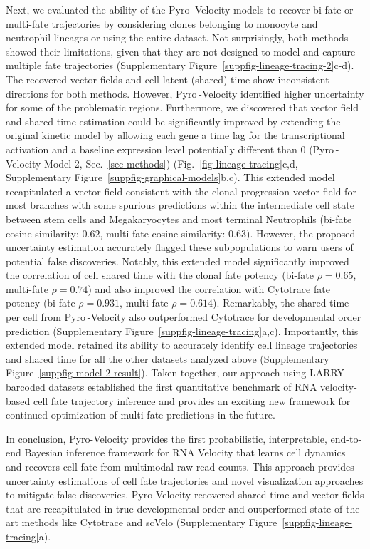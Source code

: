 \documentclass[
  sn-mathphys-num,
  lineno,
  twocolumn]{sn-jnl}
\begin{document}
Next, we evaluated the ability of the Pyro -Velocity models to recover
bi-fate or multi-fate trajectories by considering clones belonging to
monocyte and neutrophil lineages or using the entire dataset. Not
surprisingly, both methods showed their limitations, given that they are
not designed to model and capture multiple fate trajectories
(Supplementary Figure~\ref{suppfig-lineage-tracing-2}c-d). The recovered
vector fields and cell latent (shared) time show inconsistent directions
for both methods. However, Pyro -Velocity identified higher uncertainty
for some of the problematic regions. Furthermore, we discovered that
vector field and shared time estimation could be significantly improved
by extending the original kinetic model by allowing each gene a time lag
for the transcriptional activation and a baseline expression level
potentially different than 0 (Pyro -Velocity Model 2,
Sec.~\ref{sec-methods}) (Fig.~\ref{fig-lineage-tracing}c,d,
Supplementary Figure~\ref{suppfig-graphical-models}b,c). This extended
model recapitulated a vector field consistent with the clonal
progression vector field for most branches with some spurious
predictions within the intermediate cell state between stem cells and
Megakaryocytes and most terminal Neutrophils (bi-fate cosine similarity:
\(0.62\), multi-fate cosine similarity: \(0.63\)). However, the proposed
uncertainty estimation accurately flagged these subpopulations to warn
users of potential false discoveries. Notably, this extended model
significantly improved the correlation of cell shared time with the
clonal fate potency (bi-fate \(\rho=0.65\), multi-fate \(\rho=0.74\))
and also improved the correlation with Cytotrace fate potency (bi-fate
\(\rho=0.931\), multi-fate \(\rho=0.614\)). Remarkably, the shared time
per cell from Pyro -Velocity also outperformed Cytotrace for
developmental order prediction
(Supplementary Figure~\ref{suppfig-lineage-tracing}a,c). Importantly,
this extended model retained its ability to accurately identify cell
lineage trajectories and shared time for all the other datasets analyzed
above (Supplementary Figure~\ref{suppfig-model-2-result}). Taken
together, our approach using LARRY barcoded datasets established the
first quantitative benchmark of RNA velocity-based cell fate trajectory
inference and provides an exciting new framework for continued
optimization of multi-fate predictions in the future.

In conclusion, Pyro-Velocity provides the first probabilistic,
interpretable, end-to-end Bayesian inference framework for RNA Velocity
that learns cell dynamics and recovers cell fate from multimodal raw
read counts. This approach provides uncertainty estimations of cell fate
trajectories and novel visualization approaches to mitigate false
discoveries. Pyro-Velocity recovered shared time and vector fields that
are recapitulated in true developmental order and outperformed
state-of-the-art methods like Cytotrace and scVelo
(Supplementary Figure~\ref{suppfig-lineage-tracing}a).
\end{document}
